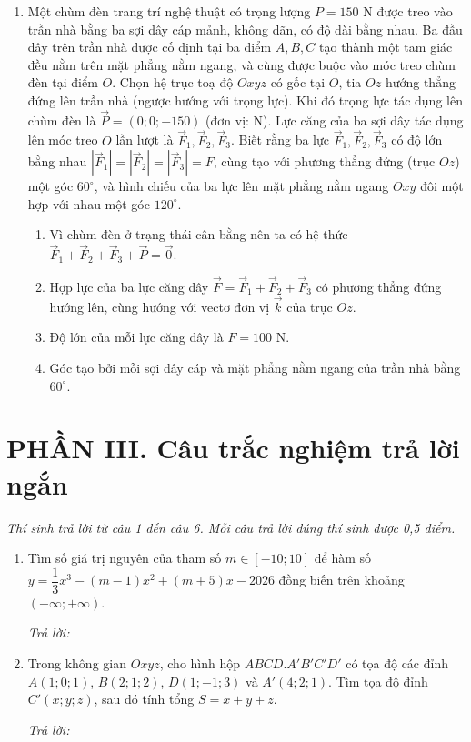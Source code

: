 \documentclass[12pt,a4paper]{article}
\newcommand{\otraloi}{\par\nobreak\smallskip\noindent\textit{Trả lời:}\quad\fbox{\rule{0pt}{11pt}\makebox[0.3cm]{}}\,\fbox{\rule{0pt}{11pt}\makebox[0.3cm]{}}\,\fbox{\rule{0pt}{11pt}\makebox[0.3cm]{}}\,\fbox{\rule{0pt}{11pt}\makebox[0.3cm]{}}}
\begin{document}
\begin{enumerate}[start=2]
\item Một chùm đèn trang trí nghệ thuật có trọng lượng $P=150\text{ N}$ được treo vào trần nhà bằng ba sợi dây cáp mảnh, không dãn, có độ dài bằng nhau. Ba đầu dây trên trần nhà được cố định tại ba điểm $A, B, C$ tạo thành một tam giác đều nằm trên mặt phẳng nằm ngang, và cùng được buộc vào móc treo chùm đèn tại điểm $O$. Chọn hệ trục toạ độ $Oxyz$ có gốc tại $O$, tia $Oz$ hướng thẳng đứng lên trần nhà (ngược hướng với trọng lực). Khi đó trọng lực tác dụng lên chùm đèn là $\vec{P}=(0;0;-150)$ (đơn vị: N). Lực căng của ba sợi dây tác dụng lên móc treo $O$ lần lượt là $\vec{F}_1, \vec{F}_2, \vec{F}_3$. Biết rằng ba lực $\vec{F}_1, \vec{F}_2, \vec{F}_3$ có độ lớn bằng nhau $|\vec{F}_1|=|\vec{F}_2|=|\vec{F}_3|=F$, cùng tạo với phương thẳng đứng (trục $Oz$) một góc $60^\circ$, và hình chiếu của ba lực lên mặt phẳng nằm ngang $Oxy$ đôi một hợp với nhau một góc $120^\circ$.
\begin{enumerate}
\item Vì chùm đèn ở trạng thái cân bằng nên ta có hệ thức $\vec{F}_1+\vec{F}_2+\vec{F}_3+\vec{P}=\vec{0}$.
\item Hợp lực của ba lực căng dây $\vec{F}=\vec{F}_1+\vec{F}_2+\vec{F}_3$ có phương thẳng đứng hướng lên, cùng hướng với vectơ đơn vị $\vec{k}$ của trục $Oz$.
\item Độ lớn của mỗi lực căng dây là $F=100\text{ N}$.
\item Góc tạo bởi mỗi sợi dây cáp và mặt phẳng nằm ngang của trần nhà bằng $60^\circ$.
\end{enumerate}
\end{enumerate}

\vspace{3pt}
\section*{\large PHẦN III. Câu trắc nghiệm trả lời ngắn}
\textit{Thí sinh trả lời từ câu 1 đến câu 6. Mỗi câu trả lời đúng thí sinh được 0,5 điểm.}
\begin{enumerate}
\item Tìm số giá trị nguyên của tham số $m\in[-10;10]$ để hàm số $y=\dfrac{1}{3}x^3-(m-1)x^2+(m+5)x-2026$ đồng biến trên khoảng $(-\infty;+\infty)$.
\otraloi

\item Trong không gian $Oxyz$, cho hình hộp $ABCD.A'B'C'D'$ có tọa độ các đỉnh $A(1;0;1)$, $B(2;1;2)$, $D(1;-1;3)$ và $A'(4;2;1)$. Tìm tọa độ đỉnh $C'(x;y;z)$, sau đó tính tổng $S=x+y+z$.
\otraloi
\end{enumerate}
\end{document}
